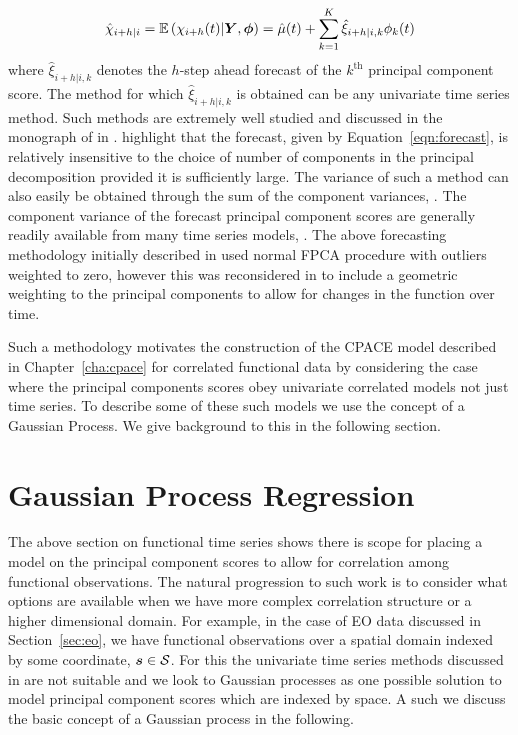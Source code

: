 \begin{equation}\label{eqn:forecast}
	\hat{\chi}_{i+h | i} = \operatorname{\mathbb{E}}\left(\chi_{i+h}(t) | \bm{{Y}}, \bm{{\phi}}\right) = \hat{\mu}(t) + \sum_{k=1}^K \hat{\xi}_{i+h | i, k} \phi_k(t) 
\end{equation}
where $\hat{\xi}_{i+h | i, k}$ denotes the $h$-step ahead forecast of the $k^\text{th}$ principal component score.
The method for which $\hat{\xi}_{i+h | i, k}$ is obtained can be any univariate time series method. Such methods are extremely well studied and discussed in the monograph of \citeauthor{hyndman_forecasting_2018} in \citep{hyndman_forecasting_2018}.
\citeauthor{hyndman_stochastic_2008} highlight that the forecast, given by Equation~\eqref{eqn:forecast}, is relatively insensitive to the choice of number of components in the principal decomposition provided it is sufficiently large.
The variance of such a method can also easily be obtained through the sum of the component variances, \citep{hyndman_stochastic_2008}.
The component variance of the forecast principal component scores are generally readily available from many time series models, \citep{hyndman_forecasting_2018}. 
The above forecasting methodology initially described in \citep{hyndman_robust_2007} used normal FPCA procedure with outliers weighted to zero, however this was reconsidered in \citep{hyndman_forecasting_2009} to include a geometric weighting to the principal components to allow for changes in the function over time. 

Such a methodology motivates the construction of the CPACE model described in Chapter~\ref{cha:cpace} for correlated functional data by considering the case where the principal components scores obey univariate correlated models not just time series. To describe some of these such models we use the concept of a Gaussian Process. We give background to this in the following section. 

\section{Gaussian Process Regression \label{sec:gp}}
The above section on functional time series shows there is scope for placing a model on the principal component scores to allow for correlation among functional observations.
The natural progression to such work is to consider what options are available when we have more complex correlation structure or a higher dimensional domain. 
For example, in the case of EO data discussed in Section~\ref{sec:eo}, we have functional observations over a spatial domain indexed by some coordinate, $\bm{{s}} \in \mathcal{S}$.
For this the univariate time series methods discussed in \citep{hyndman_forecasting_2009} are not suitable and we look to Gaussian processes as one possible solution to model principal component scores which are indexed by space.
A such we discuss the basic concept of a Gaussian process in the following. 

